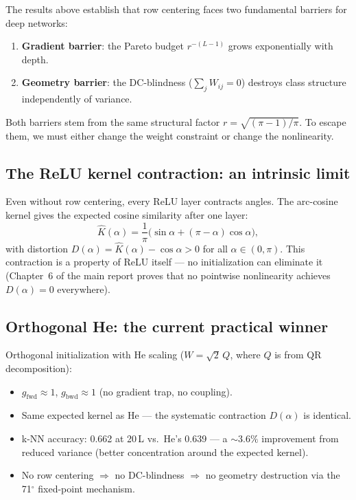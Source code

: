 \documentclass[11pt,a4paper]{article}
\theoremstyle{definition}
\begin{document}
The results above establish that row centering faces two fundamental
barriers for deep networks:
\begin{enumerate}[nosep]
  \item \textbf{Gradient barrier}: the Pareto budget $r^{-(L-1)}$ grows
        exponentially with depth.
  \item \textbf{Geometry barrier}: the DC-blindness ($\sum_j W_{ij} = 0$)
        destroys class structure independently of variance.
\end{enumerate}

Both barriers stem from the same structural factor $r = \sqrt{(\pi-1)/\pi}$.
To escape them, we must either change the weight constraint or change the
nonlinearity.

\subsection{The ReLU kernel contraction: an intrinsic limit}

Even without row centering, every ReLU layer contracts angles.  The
arc-cosine kernel gives the expected cosine similarity after one layer:
\begin{equation}\label{eq:kernel}
  \hat{K}(\alpha) = \frac{1}{\pi}\bigl(\sin\alpha + (\pi - \alpha)\cos\alpha\bigr),
\end{equation}
with distortion $D(\alpha) = \hat{K}(\alpha) - \cos\alpha > 0$ for all
$\alpha \in (0, \pi)$.  This contraction is a property of ReLU itself ---
no initialization can eliminate it (Chapter~6 of the main report proves
that no pointwise nonlinearity achieves $D(\alpha) = 0$ everywhere).

\subsection{Orthogonal He: the current practical winner}

Orthogonal initialization with He scaling ($W = \sqrt{2}\,Q$, where $Q$
is from QR decomposition):
\begin{itemize}[nosep]
  \item $g_{\mathrm{fwd}} \approx 1$, $g_{\mathrm{bwd}} \approx 1$
        (no gradient trap, no coupling).
  \item Same expected kernel as He --- the systematic contraction $D(\alpha)$
        is identical.
  \item k-NN accuracy: 0.662 at 20\,L vs.\ He's 0.639 --- a $\sim\!3.6\%$
        improvement from reduced variance (better concentration around the
        expected kernel).
  \item No row centering $\Rightarrow$ no DC-blindness $\Rightarrow$ no
        geometry destruction via the 71$^\circ$ fixed-point mechanism.
\end{itemize}
\end{document}
